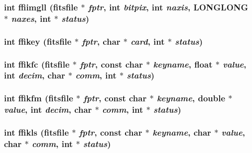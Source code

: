\subsubsection{\setlength{\rightskip}{0pt plus 5cm}int ffiimgll (\bf{fitsfile} $\ast$ {\em fptr}, int {\em bitpix}, int {\em naxis}, \bf{LONGLONG} $\ast$ {\em naxes}, int $\ast$ {\em status})}\label{fitsio_8h_657626db84e4c427330c2684375832d5}


\subsubsection{\setlength{\rightskip}{0pt plus 5cm}int ffikey (\bf{fitsfile} $\ast$ {\em fptr}, char $\ast$ {\em card}, int $\ast$ {\em status})}\label{fitsio_8h_3fad2ca6c44422526a0994f06d424607}


\subsubsection{\setlength{\rightskip}{0pt plus 5cm}int ffikfc (\bf{fitsfile} $\ast$ {\em fptr}, const char $\ast$ {\em keyname}, float $\ast$ {\em value}, int {\em decim}, char $\ast$ {\em comm}, int $\ast$ {\em status})}\label{fitsio_8h_39166dca79658791f345fcd1af07329d}


\subsubsection{\setlength{\rightskip}{0pt plus 5cm}int ffikfm (\bf{fitsfile} $\ast$ {\em fptr}, const char $\ast$ {\em keyname}, double $\ast$ {\em value}, int {\em decim}, char $\ast$ {\em comm}, int $\ast$ {\em status})}\label{fitsio_8h_a7af1984471fc7e31de5f5a5111407e4}


\subsubsection{\setlength{\rightskip}{0pt plus 5cm}int ffikls (\bf{fitsfile} $\ast$ {\em fptr}, const char $\ast$ {\em keyname}, char $\ast$ {\em value}, char $\ast$ {\em comm}, int $\ast$ {\em status})}\label{fitsio_8h_b9a20f40733eee26b83630247c6c7d6c}


